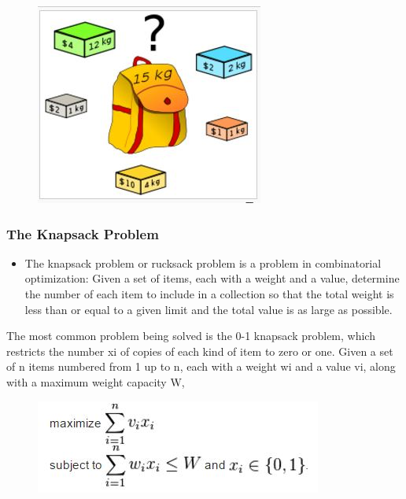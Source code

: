 \documentclass{beamer}
\begin{document}
\begin{frame}
\begin{figure}
\centering
\includegraphics[width=0.7\linewidth]{knapsack}
\caption{}
\label{fig:knapsack}
\end{figure}
\end{frame}
\begin{frame}
	\frametitle{The Knapsack Problem}
\Large
\begin{itemize}
\item The knapsack problem or rucksack problem is a problem in combinatorial optimization: Given a set of items, each with a weight and a value, determine the number of each item to include in a collection so that the total weight is less than or equal to a given limit and the total value is as large as possible.
\end{itemize}
	
\end{frame}
\begin{frame}
	The most common problem being solved is the 0-1 knapsack problem, which restricts the number xi of copies of each kind of item to zero or one. Given a set of n items numbered from 1 up to n, each with a weight wi and a value vi, along with a maximum weight capacity W,
\begin{figure}
\centering
\includegraphics[width=0.7\linewidth]{01knapsack}
\caption{}
\label{fig:01knapsack}
\end{figure}
\end{frame}
\end{document}
